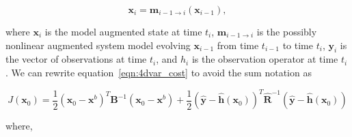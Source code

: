 \documentclass[12pt]{article}
\begin{document}
\begin{equation}
\textbf{x}_{i} = \textbf{m}_{i-1 \rightarrow i}(\textbf{x}_{i-1}), \label{eqn:nonlinmod}
\end{equation}

where \(\textbf{x}_{i}\) is the model augmented state at time \(t_i\), \(\textbf{m}_{i-1 \rightarrow i}\) is the possibly nonlinear augmented system model evolving \(\textbf{x}_{i-1}\) from time \(t_{i-1}\) to time \(t_i\), \(\textbf{y}_i\) is the vector of observations at time \(t_i\), and \(h_i\) is the observation operator at time \(t_i\). We can rewrite equation~\eqref{eqn:4dvar_cost} to avoid the sum notation as

\begin{equation}
J(\textbf{x}_0) = \frac{1}{2}(\textbf{x}_0-\textbf{x}^b)^{T}\textbf{B}^{-1}(\textbf{x}_0-\textbf{x}^b)+\frac{1}{2}(\hat{\textbf{y}}-\hat{\textbf{h}}(\textbf{x}_0))^{T}\hat{\textbf{R}}^{-1}(\hat{\textbf{y}}-\hat{\textbf{h}}(\textbf{x}_0)) \label{costfn}
\end{equation}


where,
\end{document}
